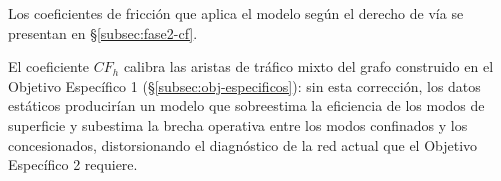 Los coeficientes de fricción que aplica el modelo según el derecho de vía se
presentan en §\ref{subsec:fase2-cf}.


El coeficiente $CF_h$ calibra las aristas de tráfico mixto del grafo construido
en el Objetivo Específico 1 (§\ref{subsec:obj-especificos}): sin esta
corrección, los datos \gtfs{} estáticos producirían un modelo que sobreestima la
eficiencia de los modos de superficie y subestima la brecha operativa entre los
modos confinados y los concesionados, distorsionando el diagnóstico de la red
actual que el Objetivo Específico 2 requiere.
